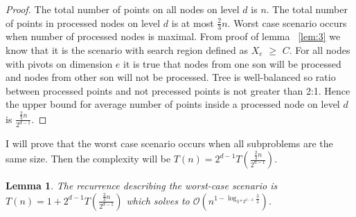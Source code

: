 \documentclass[10pt,a4paper]{article}
\newtheorem{lemma}{Lemma}
\newcommand{\Oh}{\mathcal{O}}
\begin{document}
\begin{proof}

The total number of points on all nodes on level $d$ is $n$. The total number of points in processed nodes on level $d$ is at most $\frac{2}{3}n$. Worst case scenario occurs when number of processed nodes is maximal. From proof of lemma ~\ref{lem:3} we know that it is the scenario with search region defined as $X_e$ $\geq$ $C$. For all nodes with pivots on dimension $e$ it is true that nodes from one son will be processed and nodes from other son will not be processed. Tree is well-balanced so ratio between processed points and not precessed points is not greater than 2:1. Hence the upper bound for average number of points inside a processed node on level $d$ is $\frac{\frac{2}{3}n}{2^{d-1}}$.

\end{proof}

I will prove that the worst case scenario occurs when all subproblems are the same size. Then the complexity will be $T(n)=2^{d-1}T(\frac{\frac{2}{3}n}{2^{d-1}})$.

\begin{lemma}\label{lem:5}
The recurrence describing the worst-case scenario is $T(n)=1+2^{d-1}T(\frac{\frac{2}{3}n}{2^{d-1}})$ which solves to $\Oh(n^{1 - \log_{3*2^{d-2}}{\frac{3}{2}}})$.
\end{lemma}
\end{document}
